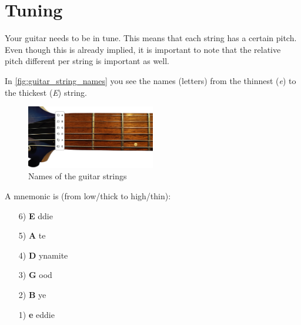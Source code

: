 \section{Tuning}

Your guitar needs to be in tune. This means that each string has a certain pitch. Even though this is already implied, it is important to note that the relative pitch different per string is important as well.

In \autoref{fig:guitar_string_names} you see the names (letters) from the thinnest (\textit{e}) to the thickest (\textit{E}) string.

\begin{figure}[h]
    \centering
    \includegraphics[width=0.5\textwidth]{../../Images/guitar-neck-string-names.png}
    \caption{Names of the guitar strings}
    \label{fig:guitar_string_names}
\end{figure}

A mnemonic is (from low/thick to high/thin):

\begin{minipage}{0.25\textwidth}
    \vspace{3mm}
    \begin{itemize}
        \setlength\itemsep{0em}
        \item[6)] \textbf{E} ddie
        \item[5)] \textbf{A} te
        \item[4)] \textbf{D} ynamite
        \item[3)] \textbf{G} ood
        \item[2)] \textbf{B} ye
        \item[1)] \textbf{e} eddie 
    \end{itemize}
    \vspace{3mm}
\end{minipage}
\hfill
\begin{minipage}{0.7\textwidth}
\end{minipage}

